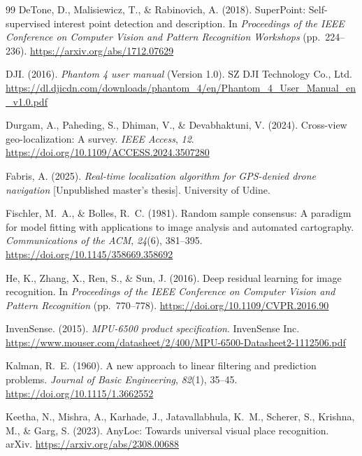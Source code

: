 \documentclass[english, Lau, oneside]{sapthesis}%
\begin{document}
\begin{thebibliography}{99}
DeTone, D., Malisiewicz, T., \& Rabinovich, A. (2018).
SuperPoint: Self-supervised interest point detection and description.
In \textit{Proceedings of the IEEE Conference on Computer Vision and Pattern Recognition Workshops} (pp.~224--236). \url{https://arxiv.org/abs/1712.07629}

DJI. (2016).
\textit{Phantom 4 user manual} (Version 1.0).
SZ DJI Technology Co., Ltd. \url{https://dl.djicdn.com/downloads/phantom_4/en/Phantom_4_User_Manual_en_v1.0.pdf}

Durgam, A., Paheding, S., Dhiman, V., \& Devabhaktuni, V. (2024).
Cross-view geo-localization: A survey.
\textit{IEEE Access}, \textit{12}. \url{https://doi.org/10.1109/ACCESS.2024.3507280}

Fabris, A. (2025).
\textit{Real-time localization algorithm for GPS-denied drone navigation} [Unpublished master's thesis].
University of Udine.

Fischler, M.~A., \& Bolles, R.~C. (1981).
Random sample consensus: A paradigm for model fitting with applications to image analysis and automated cartography.
\textit{Communications of the ACM}, \textit{24}(6), 381--395. \url{https://doi.org/10.1145/358669.358692}

He, K., Zhang, X., Ren, S., \& Sun, J. (2016).
Deep residual learning for image recognition.
In \textit{Proceedings of the IEEE Conference on Computer Vision and Pattern Recognition} (pp.~770--778). \url{https://doi.org/10.1109/CVPR.2016.90}

InvenSense. (2015).
\textit{MPU-6500 product specification}.
InvenSense Inc. \url{https://www.mouser.com/datasheet/2/400/MPU-6500-Datasheet2-1112506.pdf}

Kalman, R.~E. (1960).
A new approach to linear filtering and prediction problems.
\textit{Journal of Basic Engineering}, \textit{82}(1), 35--45. \url{https://doi.org/10.1115/1.3662552}

Keetha, N., Mishra, A., Karhade, J., Jatavallabhula, K.~M., Scherer, S., Krishna, M., \& Garg, S. (2023).
AnyLoc: Towards universal visual place recognition.
arXiv. \url{https://arxiv.org/abs/2308.00688}


\end{thebibliography}
\end{document}
